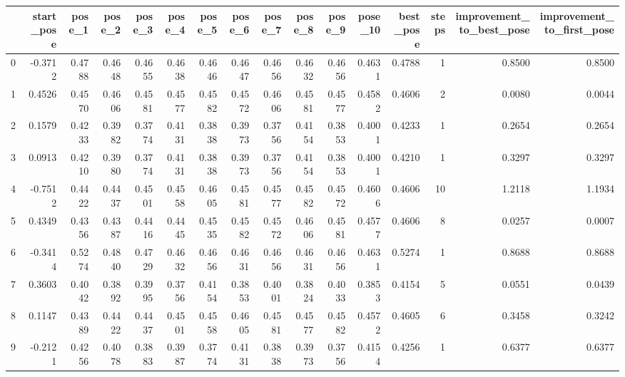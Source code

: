 \begin{tabular}{lrrrrrrrrrrrrrrr}
\toprule
{} &  start\_pose &  pose\_1 &  pose\_2 &  pose\_3 &  pose\_4 &  pose\_5 &  pose\_6 &  pose\_7 &  pose\_8 &  pose\_9 &  pose\_10 &  best\_pose &  steps &  improvement\_to\_best\_pose &  improvement\_to\_first\_pose \\
\midrule
0  &     -0.3712 &  0.4788 &  0.4648 &  0.4655 &  0.4638 &  0.4646 &  0.4647 &  0.4656 &  0.4632 &  0.4656 &   0.4631 &     0.4788 &      1 &                    0.8500 &                     0.8500 \\
1  &      0.4526 &  0.4570 &  0.4606 &  0.4581 &  0.4577 &  0.4582 &  0.4572 &  0.4606 &  0.4581 &  0.4577 &   0.4582 &     0.4606 &      2 &                    0.0080 &                     0.0044 \\
2  &      0.1579 &  0.4233 &  0.3982 &  0.3774 &  0.4131 &  0.3838 &  0.3973 &  0.3756 &  0.4154 &  0.3853 &   0.4001 &     0.4233 &      1 &                    0.2654 &                     0.2654 \\
3  &      0.0913 &  0.4210 &  0.3980 &  0.3774 &  0.4131 &  0.3838 &  0.3973 &  0.3756 &  0.4154 &  0.3853 &   0.4001 &     0.4210 &      1 &                    0.3297 &                     0.3297 \\
4  &     -0.7512 &  0.4422 &  0.4437 &  0.4501 &  0.4558 &  0.4605 &  0.4581 &  0.4577 &  0.4582 &  0.4572 &   0.4606 &     0.4606 &     10 &                    1.2118 &                     1.1934 \\
5  &      0.4349 &  0.4356 &  0.4387 &  0.4416 &  0.4445 &  0.4535 &  0.4582 &  0.4572 &  0.4606 &  0.4581 &   0.4577 &     0.4606 &      8 &                    0.0257 &                     0.0007 \\
6  &     -0.3414 &  0.5274 &  0.4840 &  0.4729 &  0.4632 &  0.4656 &  0.4631 &  0.4656 &  0.4631 &  0.4656 &   0.4631 &     0.5274 &      1 &                    0.8688 &                     0.8688 \\
7  &      0.3603 &  0.4042 &  0.3892 &  0.3995 &  0.3756 &  0.4154 &  0.3853 &  0.4001 &  0.3824 &  0.4033 &   0.3853 &     0.4154 &      5 &                    0.0551 &                     0.0439 \\
8  &      0.1147 &  0.4389 &  0.4422 &  0.4437 &  0.4501 &  0.4558 &  0.4605 &  0.4581 &  0.4577 &  0.4582 &   0.4572 &     0.4605 &      6 &                    0.3458 &                     0.3242 \\
9  &     -0.2121 &  0.4256 &  0.4078 &  0.3883 &  0.3987 &  0.3774 &  0.4131 &  0.3838 &  0.3973 &  0.3756 &   0.4154 &     0.4256 &      1 &                    0.6377 &                     0.6377 \\

\end{tabular}
